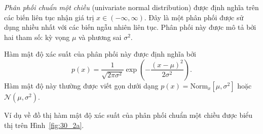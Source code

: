 \textit{Phân phối chuẩn một chiều} (univariate normal distribution) được định nghĩa trên các biến liên tục nhận giá
trị $x \in (-\infty, \infty)$. Đây là một phân phối được sử dụng nhiều nhất với
các biến ngẫu nhiên liên tục. Phân phối này được mô tả bởi hai tham số:
{kỳ vọng} $\mu$ và {phương sai} $\sigma^2$.

Hàm mật độ xác suất của phân phối này được định nghĩa bởi 
\begin{equation}
\label{eqn:30_32}
  p(x) = \frac{1}{\sqrt{2\pi \sigma^2}}\exp \left( -\frac{(x - \mu)^2}{2\sigma^2}\right).
\end{equation}
Hàm mật độ này thường được viết gọn dưới dạng $p(x) = \text{Norm}_x [\mu,
  \sigma^2]$ hoặc $\mathcal{N}(\mu, \sigma^2)$.

Ví dụ về đồ thị hàm mật độ xác suất của phân phối chuẩn một chiều được biểu thị
trên Hình~\ref{fig:30_2a}.

